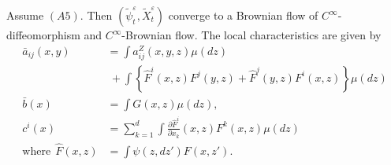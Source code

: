 \begin{theorem}\label{c3:thm3.9.1} %
  Assume $(A5)$. Then $(\tilde{\psi}^\varepsilon_t, \tilde{X}^\varepsilon_t)$
  converge to a Brownian flow of $C^\infty$-diffeomorphism and $C^
  \infty$-Brownian flow. The local characteristics are given by 
  \begin{align*}
    \bar{a}_{ij}(x,y)& = \int a^Z_{ij}(x,y,z) \mu (dz)\\ 
    & ~ + \int \left\{ \hat{F}^i
    (x,z)F^j (y,z)+ \hat{F}^j (y,z)F^i (x,z) \right\} \mu (dz) \tag{3.9.18}\label{c3:eq3.9.18}\\ 
    \bar{b}(x) & = \int G(x,z) \mu (dz), \tag{3.9.19}\label{c3:eq3.9.19}\\
    c^i (x) & = \sum ^d_{k=1} \int \frac{\partial \hat{F}^i}{\partial
      x_k} (x,z)F^k (x,z)\mu (dz) \tag{3.9.20}\label{c3:eq3.9.20}\\ 
    \text{where}~~\hat{F}(x,z) & = \int \psi (z,dz')F(x,z'). 
    \tag{3.9.21}\label{c3:eq3.9.21}
  \end{align*}
\end{theorem}

